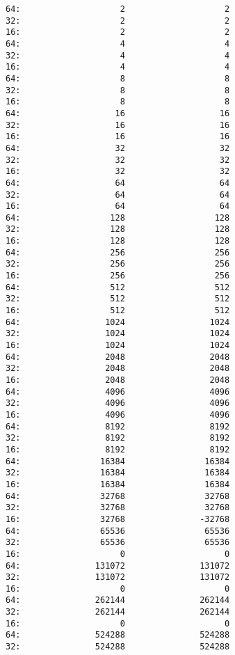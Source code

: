 \documentclass[11pt]{article}
\begin{document}
\begin{verbatim}
64:                    2                    2
32:                    2                    2
16:                    2                    2
64:                    4                    4
32:                    4                    4
16:                    4                    4
64:                    8                    8
32:                    8                    8
16:                    8                    8
64:                   16                   16
32:                   16                   16
16:                   16                   16
64:                   32                   32
32:                   32                   32
16:                   32                   32
64:                   64                   64
32:                   64                   64
16:                   64                   64
64:                  128                  128
32:                  128                  128
16:                  128                  128
64:                  256                  256
32:                  256                  256
16:                  256                  256
64:                  512                  512
32:                  512                  512
16:                  512                  512
64:                 1024                 1024
32:                 1024                 1024
16:                 1024                 1024
64:                 2048                 2048
32:                 2048                 2048
16:                 2048                 2048
64:                 4096                 4096
32:                 4096                 4096
16:                 4096                 4096
64:                 8192                 8192
32:                 8192                 8192
16:                 8192                 8192
64:                16384                16384
32:                16384                16384
16:                16384                16384
64:                32768                32768
32:                32768                32768
16:                32768               -32768
64:                65536                65536
32:                65536                65536
16:                    0                    0
64:               131072               131072
32:               131072               131072
16:                    0                    0
64:               262144               262144
32:               262144               262144
16:                    0                    0
64:               524288               524288
32:               524288               524288

\end{verbatim}
\end{document}

